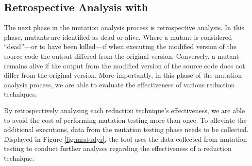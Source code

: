 \subsection{Retrospective Analysis with \mr}

The next phase in the mutation analysis process is retrospective analysis. In this
phase, mutants are identified as dead or alive. Where a mutant is considered
``dead''---or to have been killed---if when executing the modified version of the source
code the output differed from the original version. Conversely, a mutant remains alive
if the output from the modified version of the source code does not differ from the
original version. More importantly, in this phase of the mutation analysis process,
we are able to evaluate the effectiveness of various reduction techniques.

By retrospectively analysing each reduction technique's effectiveness, we are
able to avoid the cost of performing mutation testing more than once. To alleviate
the additional executions, data from the mutation testing phase needs to be collected.
Displayed in Figure \ref{fig:mrstudyr},
the \mr tool uses the data collected from mutation testing to conduct further analyses
regarding the effectiveness of a reduction technique.
